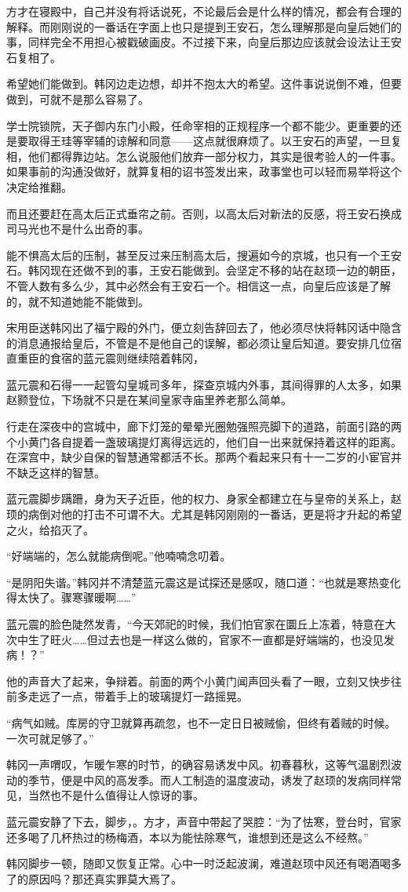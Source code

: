 方才在寝殿中，自己并没有将话说死，不论最后会是什么样的情况，都会有合理的解释。而刚刚说的一番话在字面上也只是提到王安石，怎么理解那是向皇后她们的事，同样完全不用担心被戳破画皮。不过接下来，向皇后那边应该就会设法让王安石复相了。

希望她们能做到。韩冈边走边想，却并不抱太大的希望。这件事说说倒不难，但要做到，可就不是那么容易了。

学士院锁院，天子御内东门小殿，任命宰相的正规程序一个都不能少。更重要的还是要取得王珪等宰辅的谅解和同意——这点就很麻烦了。以王安石的声望，一旦复相，他们都得靠边站。怎么说服他们放弃一部分权力，其实是很考验人的一件事。如果事前的沟通没做好，就算复相的诏书签发出来，政事堂也可以轻而易举将这个决定给推翻。

而且还要赶在高太后正式垂帘之前。否则，以高太后对新法的反感，将王安石换成司马光也不是什么出奇的事。

能不惧高太后的压制，甚至反过来压制高太后，搜遍如今的京城，也只有一个王安石。韩冈现在还做不到的事，王安石能做到。会坚定不移的站在赵顼一边的朝臣，不管人数有多么少，其中必然会有王安石一个。相信这一点，向皇后应该是了解的，就不知道她能不能做到。

宋用臣送韩冈出了福宁殿的外门，便立刻告辞回去了，他必须尽快将韩冈话中隐含的消息通报给皇后，不管是不是他自己的误解，都必须让皇后知道。要安排几位宿直重臣的食宿的蓝元震则继续陪着韩冈，

蓝元震和石得一一起管勾皇城司多年，探查京城内外事，其间得罪的人太多，如果赵颢登位，下场就不只是在某间皇家寺庙里养老那么简单。

行走在深夜中的宫城中，廊下灯笼的晕晕光圈勉强照亮脚下的道路，前面引路的两个小黄门各自提着一盏玻璃提灯离得远远的，他们自一出来就保持着这样的距离。在深宫中，缺少自保的智慧通常都活不长。那两个看起来只有十一二岁的小宦官并不缺乏这样的智慧。

蓝元震脚步蹒跚，身为天子近臣，他的权力、身家全都建立在与皇帝的关系上，赵顼的病倒对他的打击不可谓不大。尤其是韩冈刚刚的一番话，更是将才升起的希望之火，给掐灭了。

“好端端的，怎么就能病倒呢。”他喃喃念叨着。

“是阴阳失谐。”韩冈并不清楚蓝元震这是试探还是感叹，随口道：“也就是寒热变化得太快了。骤寒骤暖啊……”

蓝元震的脸色陡然发青，“今天郊祀的时候，我们怕官家在圜丘上冻着，特意在大次中生了旺火……但过去也是一样这么做的，官家不一直都是好端端的，也没见发病！？”

他的声音大了起来，争辩着。前面的两个小黄门闻声回头看了一眼，立刻又快步往前多走远了一点，带着手上的玻璃提灯一路摇晃。

“病气如贼。库房的守卫就算再疏忽，也不一定日日被贼偷，但终有着贼的时候。一次可就足够了。”

韩冈一声喟叹，乍暖乍寒的时节，的确容易诱发中风。初春暮秋，这等气温剧烈波动的季节，便是中风的高发季。而人工制造的温度波动，诱发了赵顼的发病同样常见，当然也不是什么值得让人惊讶的事。

蓝元震安静了下去，脚步，。方才，声音中带起了哭腔：“为了怯寒，登台时，官家还多喝了几杯热过的杨梅酒，本以为能怯除寒气，谁想到还是这么不经熬。”

韩冈脚步一顿，随即又恢复正常。心中一时泛起波澜，难道赵顼中风还有喝酒喝多了的原因吗？那还真实罪莫大焉了。

